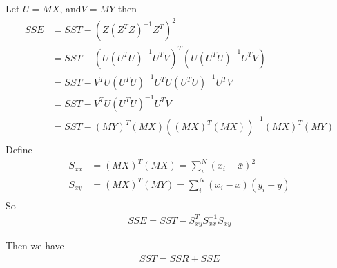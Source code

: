 \documentclass[a4paper]{article}
\begin{document}
Let $U = MX$, and$V= MY$ then
\begin{align*}
SSE & = SST - (Z(Z^TZ)^{-1}Z^T)^2 \\
      &  = SST - (U(U^TU)^{-1}U^TV)^T (U(U^TU)^{-1}U^TV) \\
      &  = SST - V^TU(U^TU)^{-1}U^TU(U^TU)^{-1}U^TV\\
      &  = SST - V^TU(U^TU)^{-1}U^TV\\
      &  = SST - (MY)^T(MX)((MX)^T(MX))^{-1}(MX)^T(MY)\\
\end{align*}
Define
\begin{align*}
S_{xx} &= (MX)^T(MX)  = \sum_{i}^N (x_i - \bar x)^2\\
S_{xy} &= (MX)^T(MY) = \sum_{i}^N (x_i - \bar x)(y_i -\bar y)\\
\end{align*}
So
\begin{align*}
SSE = SST - S_{xy}^T S_{xx}^{-1} S_{xy}
\end{align*}

Then we have
\begin{align*}
SST = SSR + SSE
\end{align*}
\end{document}
